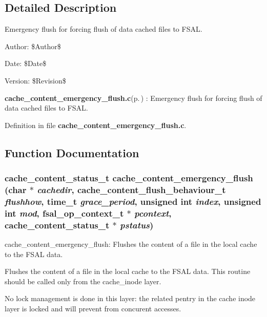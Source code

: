 \subsection{Detailed Description}
Emergency flush for forcing flush of data cached files to FSAL. 

\begin{Desc}
\item[Author:]\$Author\$ \end{Desc}
\begin{Desc}
\item[Date:]\$Date\$ \end{Desc}
\begin{Desc}
\item[Version:]\$Revision\$ \end{Desc}
{\bf cache\_\-content\_\-emergency\_\-flush.c}{\rm (p.\,\pageref{cache__content__emergency__flush_8c})} : Emergency flush for forcing flush of data cached files to FSAL.

Definition in file {\bf cache\_\-content\_\-emergency\_\-flush.c}.

\subsection{Function Documentation}
\subsubsection{\setlength{\rightskip}{0pt plus 5cm}cache\_\-content\_\-status\_\-t cache\_\-content\_\-emergency\_\-flush (char $\ast$ {\em cachedir}, cache\_\-content\_\-flush\_\-behaviour\_\-t {\em flushhow}, time\_\-t {\em grace\_\-period}, unsigned int {\em index}, unsigned int {\em mod}, fsal\_\-op\_\-context\_\-t $\ast$ {\em pcontext}, cache\_\-content\_\-status\_\-t $\ast$ {\em pstatus})}\label{cache__content__emergency__flush_8c_a1}


cache\_\-content\_\-emergency\_\-flush: Flushes the content of a file in the local cache to the FSAL data.

Flushes the content of a file in the local cache to the FSAL data. This routine should be called only from the cache\_\-inode layer.

No lock management is done in this layer: the related pentry in the cache inode layer is locked and will prevent from concurent accesses.

